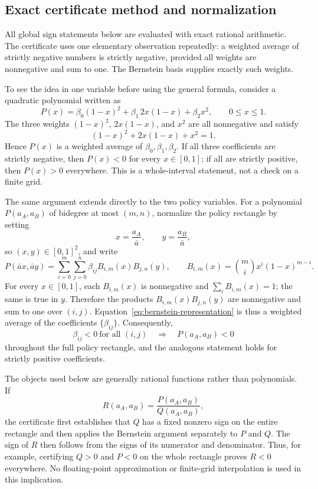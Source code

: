 \subsection{Exact certificate method and normalization}\label{app:certificate-method}

All global sign statements below are evaluated with exact rational arithmetic. The certificate uses one elementary observation repeatedly: a weighted average of strictly negative numbers is strictly negative, provided all weights are nonnegative and sum to one. The Bernstein basis supplies exactly such weights.

To see the idea in one variable before using the general formula, consider a quadratic polynomial written as
\begin{equation}
P(x)=\beta_0(1-x)^2+\beta_1\,2x(1-x)+\beta_2x^2,
\qquad 0\leq x\leq 1.
\label{eq:bernstein-simple}
\end{equation}
The three weights $(1-x)^2$, $2x(1-x)$, and $x^2$ are all nonnegative and satisfy
\[
(1-x)^2+2x(1-x)+x^2=1.
\]
Hence $P(x)$ is a weighted average of $\beta_0,\beta_1,\beta_2$. If all three coefficients are strictly negative, then $P(x)<0$ for every $x\in[0,1]$; if all are strictly positive, then $P(x)>0$ everywhere. This is a whole-interval statement, not a check on a finite grid.

The same argument extends directly to the two policy variables. For a polynomial $P(a_A,a_B)$ of bidegree at most $(m,n)$, normalize the policy rectangle by setting
\begin{equation}
x=\frac{a_A}{\bar a},\qquad y=\frac{a_B}{\bar a},
\end{equation}
so $(x,y)\in[0,1]^2$, and write
\begin{equation}
P(\bar a x,\bar a y)
=\sum_{i=0}^{m}\sum_{j=0}^{n}\beta_{ij}
B_{i,m}(x)B_{j,n}(y),
\qquad
B_{i,m}(x)=\binom mi x^i(1-x)^{m-i}.
\label{eq:bernstein-representation}
\end{equation}
For every $x\in[0,1]$, each $B_{i,m}(x)$ is nonnegative and $\sum_i B_{i,m}(x)=1$; the same is true in $y$. Therefore the products $B_{i,m}(x)B_{j,n}(y)$ are nonnegative and sum to one over $(i,j)$. Equation~\eqref{eq:bernstein-representation} is thus a weighted average of the coefficients $\{\beta_{ij}\}$. Consequently,
\[
\beta_{ij}<0\ \text{for all }(i,j)
\quad\Longrightarrow\quad
P(a_A,a_B)<0
\]
throughout the full policy rectangle, and the analogous statement holds for strictly positive coefficients.

The objects used below are generally rational functions rather than polynomials. If
\[
R(a_A,a_B)=\frac{P(a_A,a_B)}{Q(a_A,a_B)},
\]
the certificate first establishes that $Q$ has a fixed nonzero sign on the entire rectangle and then applies the Bernstein argument separately to $P$ and $Q$. The sign of $R$ then follows from the signs of its numerator and denominator. Thus, for example, certifying $Q>0$ and $P<0$ on the whole rectangle proves $R<0$ everywhere. No floating-point approximation or finite-grid interpolation is used in this implication.

